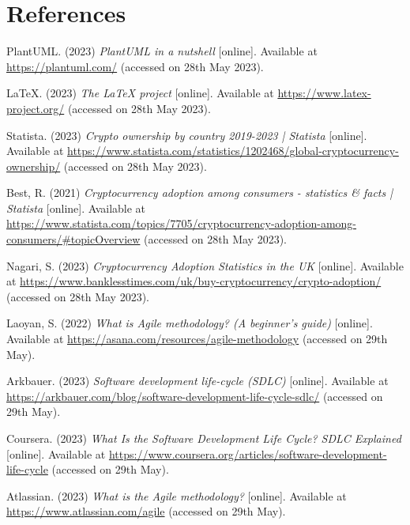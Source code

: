 \section{References}

\noindent [1] PlantUML. (2023) \textit{PlantUML in a nutshell} [online]. Available at \url{https://plantuml.com/} (accessed on 28th May 2023).
\vspace{0.2cm}

\noindent [2] LaTeX. (2023) \textit{The LaTeX project} [online]. Available at \url{https://www.latex-project.org/} (accessed on 28th May 2023).
\vspace{0.2cm}

\noindent [3] Statista. (2023) \textit{Crypto ownership by country 2019-2023 | Statista} [online]. Available at \url{https://www.statista.com/statistics/1202468/global-cryptocurrency-ownership/} (accessed on 28th May 2023).
\vspace{0.2cm}

\noindent [4] Best, R. (2021) \textit{Cryptocurrency adoption among consumers - statistics \& facts | Statista} [online]. Available at \url{https://www.statista.com/topics/7705/cryptocurrency-adoption-among-consumers/#topicOverview} (accessed on 28th May 2023).
\vspace{0.2cm}

\noindent [5] Nagari, S. (2023) \textit{Cryptocurrency Adoption Statistics in the UK} [online]. Available at \url{https://www.banklesstimes.com/uk/buy-cryptocurrency/crypto-adoption/} (accessed on 28th May 2023).
\vspace{0.2cm}

\noindent [6] Laoyan, S. (2022) \textit{What is Agile methodology? (A beginner's guide)} [online]. Available at \url{https://asana.com/resources/agile-methodology} (accessed on 29th May).
\vspace{0.2cm}

\noindent [7] Arkbauer. (2023) \textit{Software development life-cycle (SDLC)} [online]. Available at \url{https://arkbauer.com/blog/software-development-life-cycle-sdlc/} (accessed on 29th May).
\vspace{0.2cm}

\noindent [8] Coursera. (2023) \textit{What Is the Software Development Life Cycle? SDLC Explained} [online]. Available at \url{https://www.coursera.org/articles/software-development-life-cycle} (accessed on 29th May).
\vspace{0.2cm}

\noindent [9] Atlassian. (2023) \textit{What is the Agile methodology?} [online]. Available at \url{https://www.atlassian.com/agile} (accessed on 29th May).
\vspace{0.2cm}


